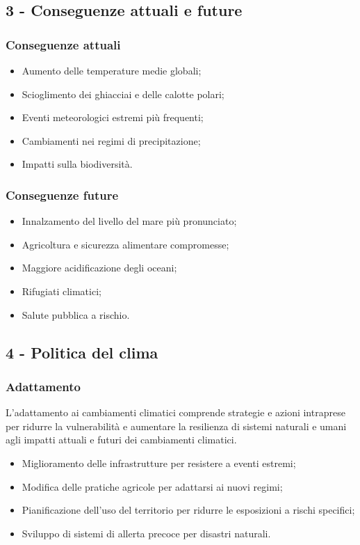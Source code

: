 \documentclass{article}
\begin{document}
\subsection{3 - Conseguenze attuali e future}
\subsubsection{Conseguenze attuali}
\begin{itemize}
    \item Aumento delle temperature medie globali;
    \item Scioglimento dei ghiacciai e delle calotte polari;
    \item Eventi meteorologici estremi più frequenti;
    \item Cambiamenti nei regimi di precipitazione;
    \item Impatti sulla biodiversità.
\end{itemize}

\subsubsection{Conseguenze future}
\begin{itemize}
    \item Innalzamento del livello del mare più pronunciato;
    \item Agricoltura e sicurezza alimentare compromesse;
    \item Maggiore acidificazione degli oceani;
    \item Rifugiati climatici;
    \item Salute pubblica a rischio.
\end{itemize}

\subsection{4 - Politica del clima}
\subsubsection{Adattamento}
L'adattamento ai cambiamenti climatici comprende strategie e azioni intraprese per ridurre la
vulnerabilità e aumentare la resilienza di sistemi naturali e umani agli impatti attuali e
futuri dei cambiamenti climatici.
\begin{itemize}
    \item Miglioramento delle infrastrutture per resistere a eventi estremi;
    \item Modifica delle pratiche agricole per adattarsi ai nuovi regimi;
    \item Pianificazione dell'uso del territorio per ridurre le esposizioni a rischi specifici;
    \item Sviluppo di sistemi di allerta precoce per disastri naturali.
\end{itemize}
\end{document}
